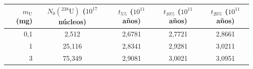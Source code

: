 \begin{tabular}{rcccc}
\toprule
$m_{\mathrm{U}}$ (mg) & $N_0(^{238}\mathrm{U})$ ($10^{17}$ núcleos) & $t_{5\%}$ ($10^{11}$ años) & $t_{10\%}$ ($10^{11}$ años) & $t_{20\%}$ ($10^{11}$ años) \\
\midrule
0,1 & 2,512 & 2,6781 & 2,7721 & 2,8661 \\
1 & 25,116 & 2,8341 & 2,9281 & 3,0211 \\
3 & 75,349 & 2,9081 & 3,0021 & 3,0951 \\
\bottomrule
\end{tabular}
